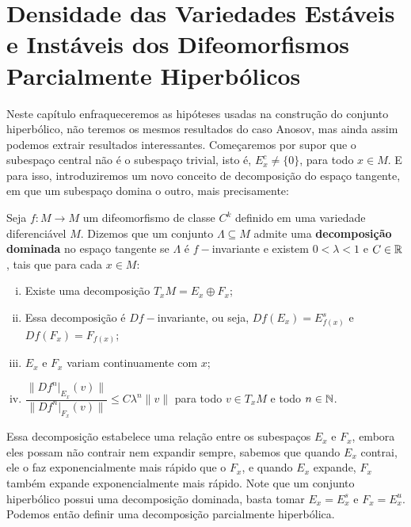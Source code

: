 %

\chapter{Densidade das Variedades Estáveis e Instáveis dos Difeomorfismos Parcialmente Hiperbólicos}

Neste capítulo enfraqueceremos as hipóteses usadas na construção do conjunto hiperbólico, não teremos os mesmos resultados do caso Anosov, mas ainda assim podemos extrair resultados interessantes. Começaremos por supor que o subespaço central não é o subespaço trivial, isto é, $E^c_x\neq\{0\}$, para todo $x\in M$. E para isso, introduziremos um novo conceito de decomposição do espaço tangente, em que um subespaço domina o outro, mais precisamente:

\begin{definicao} Seja $f:M\to M$ um difeomorfismo de classe $C^k$ definido em uma variedade diferenciável $M$. Dizemos que um conjunto $\Lambda\subseteq M$ admite uma \textbf{decomposição dominada} no espaço tangente se $\Lambda$ é $f-$invariante e existem $0<\lambda<1$ e $C\in\mathbb{R}$, tais que para cada $x\in M$:
\begin{enumerate}[i)]
\item Existe uma decomposição $T_xM=E_x\oplus F_x$;
\item Essa decomposição é $Df-$invariante, ou seja, $Df(E_x)=E_{f(x)}^s$ e $Df(F_x)=F_{f(x)}$;
\item $E_x$ e $F_x$ variam continuamente com $x$;
\item $\dfrac{\|Df^n|_{E_x}(v)\|}{\|Df^{n}|_{F_x}(v)\|}\leq C\lambda^n\|v\|$ para todo $v\in T_xM$  e todo $n\in\mathbb{N}$.
\end{enumerate}
\end{definicao}

Essa decomposição estabelece uma relação entre os subespaços $E_x$ e $F_x$, embora eles possam não contrair nem expandir sempre, sabemos que quando $E_x$ contrai, ele o faz exponencialmente mais rápido que o $F_x$, e quando $E_x$ expande, $F_x$ também expande exponencialmente mais rápido. Note que um conjunto hiperbólico possui uma decomposição dominada, basta tomar $E_x=E_x^s$ e $F_x=E_x^u$. Podemos então definir uma decomposição parcialmente hiperbólica.

